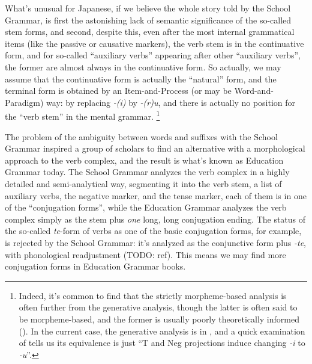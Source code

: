 \documentclass[UTF8, a4paper, oneside, scheme=plain]{ctexart}
\newcommand{\corpus}[1]{\emph{#1}}
\begin{document}
What's unusual for Japanese, if we believe the whole story told by the School Grammar, is 
first the astonishing lack of semantic significance of the so-called stem forms,
and second, despite this,
even after the most internal grammatical items (like the passive or causative markers),
the verb stem is in the continuative form, 
and for so-called ``auxiliary verbs'' appearing after other ``auxiliary verbs'',
the former are almost always in the continuative form.
So actually, we may assume that 
the continuative form is actually the ``natural'' form,
and the terminal form is obtained by an Item-and-Process (or may be Word-and-Paradigm) way:
by replacing \corpus{-(i)} by \corpus{-(r)u},
and there is actually no position for the ``verb stem'' in the mental grammar.%
\footnote{
    Indeed, it's common to find that the strictly morpheme-based analysis
    is often further from the generative analysis,
    though the latter is often said to be morpheme-based,
    and the former is usually poorly theoretically informed ().
    In the current case, the generative analysis is in ,
    and a quick examination of  tells us 
    its equivalence is just ``T and Neg projections induce changing \corpus{-i} to \corpus{-u}''.
}

The problem of the ambiguity between words and suffixes with the School Grammar
inspired a group of scholars to find an alternative with a morphological approach to the verb complex,
and the result is what's known as Education Grammar today.
The School Grammar analyzes the verb complex in a highly detailed and semi-analytical way,
segmenting it into the verb stem, a list of auxiliary verbs, the negative marker, and the tense marker,
each of them is in one of the ``conjugation forms'',
while the Education Grammar analyzes the verb complex 
simply as the stem plus \emph{one} long, long conjugation ending.
The status of the so-called \corpus{te}-form of verbs as one of the basic conjugation forms, for example,
is rejected by the School Grammar:
it's analyzed as the conjunctive form plus \corpus{-te},
with phonological readjustment (TODO: ref).
This means we may find more conjugation forms in Education Grammar books.
\end{document}

